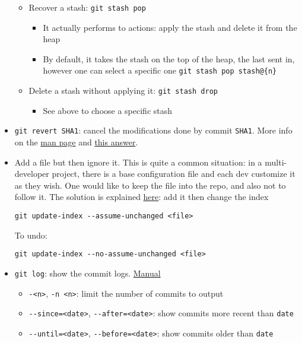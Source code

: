 \documentclass[a4paper,12pt,%
              final%
              ]{article}
\begin{document}
\begin{itemize}
\begin{itemize}
\begin{itemize}
        \end{itemize}
      \item Recover a stash: \texttt{git stash pop}
        \begin{itemize}
          \item It actually performs to actions: apply the stash and delete it from the heap
          \item By default, it takes the stash on the top of the heap, the last sent in, however one can select a specific one \verb|git stash pop stash@{n}|
        \end{itemize}
      \item Delete a stash without applying it: \texttt{git stash drop}
        \begin{itemize}
          \item See above to choose a specific stash
        \end{itemize}
    \end{itemize}
  \item \texttt{git revert SHA1}: cancel the modifications done by commit \texttt{SHA1}. More info on the \href{https://git-scm.com/docs/git-revert}{man page} and \href{https://stackoverflow.com/a/4114122}{this answer}.
  \item Add a file but then ignore it. This is quite a common situation: in a multi-developer project, there is a base configuration file and each dev customize it as they wish. One would like to keep the file into the repo, and also not to follow it. The solution is explained \href{https://stackoverflow.com/questions/3319479/can-i-git-commit-a-file-and-ignore-its-content-changes}{here}: add it then change the index
\begin{verbatim}
git update-index --assume-unchanged <file>
\end{verbatim}
    To undo:
\begin{verbatim}
git update-index --no-assume-unchanged <file>
\end{verbatim}
  \item \texttt{git log}: show the commit logs. \href{https://git-scm.com/docs/git-log}{Manual}
    \begin{itemize}
      \item \texttt{-<n>}, \texttt{-n <n>}: limit the number of commits to output
      \item \verb|--since=<date>|, \verb|--after=<date>|: show commits more recent than \texttt{date}
      \item \verb|--until=<date>|, \verb|--before=<date>|: show commits older than \texttt{date}

\end{itemize}
\end{itemize}
\end{document}

